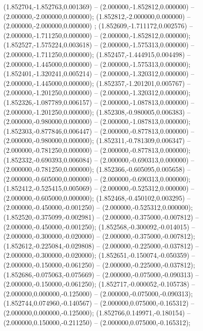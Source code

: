  (1.852704,-1.852763,0.001369) -- (2.000000,-1.852812,0.000000) -- (2.000000,-2.000000,0.000000);
 (1.852812,-2.000000,0.000000) -- (2.000000,-2.000000,0.000000) ;
 (1.852609,-1.711172,0.002576) -- (2.000000,-1.711250,0.000000) -- (2.000000,-1.852812,0.000000);
 (1.852527,-1.575224,0.003618) -- (2.000000,-1.575313,0.000000) -- (2.000000,-1.711250,0.000000);
 (1.852457,-1.444915,0.004498) -- (2.000000,-1.445000,0.000000) -- (2.000000,-1.575313,0.000000);
 (1.852401,-1.320241,0.005214) -- (2.000000,-1.320312,0.000000) -- (2.000000,-1.445000,0.000000);
 (1.852357,-1.201201,0.005767) -- (2.000000,-1.201250,0.000000) -- (2.000000,-1.320312,0.000000);
 (1.852326,-1.087789,0.006157) -- (2.000000,-1.087813,0.000000) -- (2.000000,-1.201250,0.000000);
 (1.852308,-0.980005,0.006383) -- (2.000000,-0.980000,0.000000) -- (2.000000,-1.087813,0.000000);
 (1.852303,-0.877846,0.006447) -- (2.000000,-0.877813,0.000000) -- (2.000000,-0.980000,0.000000);
 (1.852311,-0.781309,0.006347) -- (2.000000,-0.781250,0.000000) -- (2.000000,-0.877813,0.000000);
 (1.852332,-0.690393,0.006084) -- (2.000000,-0.690313,0.000000) -- (2.000000,-0.781250,0.000000);
 (1.852366,-0.605095,0.005658) -- (2.000000,-0.605000,0.000000) -- (2.000000,-0.690313,0.000000);
 (1.852412,-0.525415,0.005069) -- (2.000000,-0.525312,0.000000) -- (2.000000,-0.605000,0.000000);
 (1.852468,-0.450102,0.003295) -- (2.000000,-0.450000,-0.001250) -- (2.000000,-0.525312,0.000000);
 (1.852520,-0.375099,-0.002981) -- (2.000000,-0.375000,-0.007812) -- (2.000000,-0.450000,-0.001250);
 (1.852568,-0.300092,-0.014015) -- (2.000000,-0.300000,-0.020000) -- (2.000000,-0.375000,-0.007812);
 (1.852612,-0.225084,-0.029808) -- (2.000000,-0.225000,-0.037812) -- (2.000000,-0.300000,-0.020000);
 (1.852651,-0.150074,-0.050359) -- (2.000000,-0.150000,-0.061250) -- (2.000000,-0.225000,-0.037812);
 (1.852686,-0.075063,-0.075669) -- (2.000000,-0.075000,-0.090313) -- (2.000000,-0.150000,-0.061250);
 (1.852717,-0.000052,-0.105738) -- (2.000000,0.000000,-0.125000) -- (2.000000,-0.075000,-0.090313);
 (1.852744,0.074960,-0.140567) -- (2.000000,0.075000,-0.165312) -- (2.000000,0.000000,-0.125000);
 (1.852766,0.149971,-0.180154) -- (2.000000,0.150000,-0.211250) -- (2.000000,0.075000,-0.165312);
